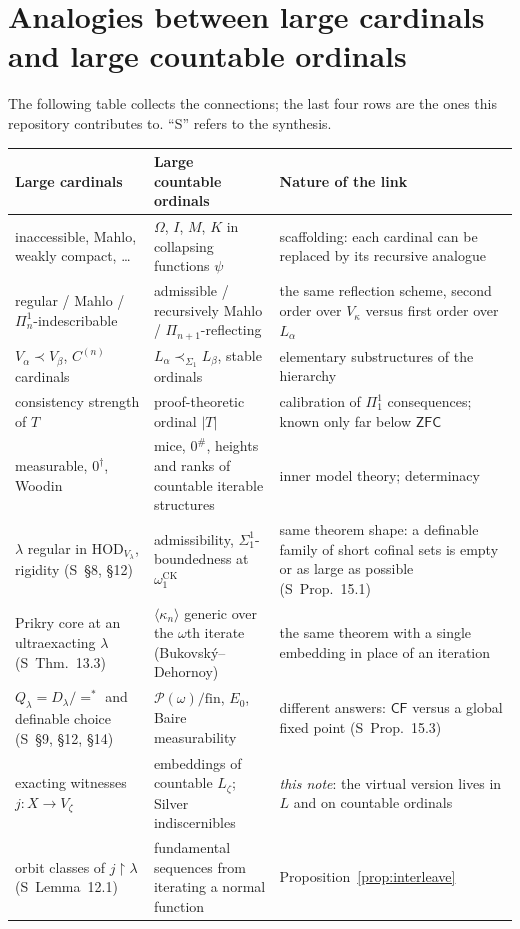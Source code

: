 \documentclass[11pt,letterpaper]{article}
\theoremstyle{definition}
\numberwithin{equation}{section}
\newcommand{\ZFC}{\mathsf{ZFC}}
\newcommand{\HOD}{\mathrm{HOD}}
\newcommand{\Pow}{\mathcal P}
\newcommand{\restr}{\mathbin{\upharpoonright}}
\newcommand{\CF}{\mathsf{CF}}
\begin{document}
\section{Analogies between large cardinals and large countable ordinals}

The following table collects the connections; the last four rows are the ones this repository contributes to. ``S'' refers to the synthesis.

\begin{center}\small
\renewcommand{\arraystretch}{1.2}
\begin{tabularx}{\textwidth}{@{}P{.3\textwidth}P{.3\textwidth}Y@{}}
\toprule
\textbf{Large cardinals}&\textbf{Large countable ordinals}&\textbf{Nature of the link}\\\midrule
inaccessible, Mahlo, weakly compact, \dots&$\Omega$, $I$, $M$, $K$ in collapsing functions $\psi$&scaffolding: each cardinal can be replaced by its recursive analogue\\
regular / Mahlo / $\Pi^1_n$-indescribable&admissible / recursively Mahlo / $\Pi_{n+1}$-reflecting&the same reflection scheme, second order over $V_\kappa$ versus first order over $L_\alpha$\\
$V_\alpha\prec V_\beta$, $C^{(n)}$ cardinals&$L_\alpha\prec_{\Sigma_1}L_\beta$, stable ordinals&elementary substructures of the hierarchy\\
consistency strength of $T$&proof-theoretic ordinal $|T|$&calibration of $\Pi^1_1$ consequences; known only far below $\ZFC$\\
measurable, $0^\dagger$, Woodin&mice, $0^\#$, heights and ranks of countable iterable structures&inner model theory; determinacy\\\midrule
$\lambda$ regular in $\HOD_{V_\lambda}$, rigidity (S~\S8, \S12)&admissibility, $\Sigma^1_1$-boundedness at $\omega_1^{\mathrm{CK}}$&same theorem shape: a definable family of short cofinal sets is empty or as large as possible (S~Prop.~15.1)\\
Prikry core at an ultraexacting $\lambda$ (S~Thm.~13.3)&$\langle\kappa_n\rangle$ generic over the $\omega$th iterate (Bukovsk\'y--Dehornoy)&the same theorem with a single embedding in place of an iteration\\
$Q_\lambda=D_\lambda/{=^*}$ and definable choice (S~\S9, \S12, \S14)&$\Pow(\omega)/\mathrm{fin}$, $E_0$, Baire measurability&different answers: $\CF$ versus a global fixed point (S~Prop.~15.3)\\
exacting witnesses $j:X\to V_\zeta$&embeddings of countable $L_\zeta$; Silver indiscernibles&\emph{this note}: the virtual version lives in $L$ and on countable ordinals\\
orbit classes of $j\restr\lambda$ (S~Lemma~12.1)&fundamental sequences from iterating a normal function&Proposition~\ref{prop:interleave}\\
\bottomrule
\end{tabularx}
\end{center}
\end{document}

